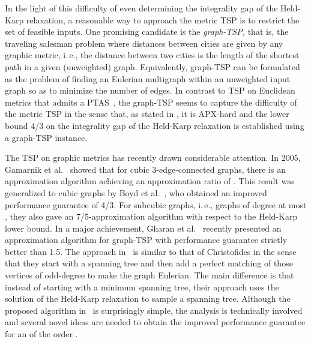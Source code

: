 \documentclass[letterpaper,11pt]{article}
\newcommand{\TSP}{graph-TSP\xspace}
\begin{document}
    In the light of this difficulty of even determining the integrality gap of
    the Held-Karp relaxation, a reasonable way to approach the metric TSP
    is to restrict the set of feasible inputs. One promising candidate is
    the \emph{\TSP,} that is, the traveling salesman problem where
    distances between cities are given by any graphic metric, i.\,e., the
    distance between two cities is the length of the shortest path in a
    given (unweighted) graph. Equivalently, \TSP can be formulated as the
    problem of finding an Eulerian multigraph within an unweighted input
    graph so as to minimize the number of edges. In contrast to TSP on
    Euclidean metrics that admits a PTAS~\cite{Arora98,Mitch99}, the \TSP
    seems to capture the difficulty of the metric TSP in the sense that,
    as stated in \cite{GKP95}, it is APX-hard and the lower bound 4/3 on
    the integrality gap of the Held-Karp relaxation is established using a
    \TSP instance.

    The TSP on graphic metrics has recently drawn considerable attention.
    In 2005, Gamarnik et al.~\cite{GLS05} showed that for cubic
    3-edge-connected graphs, there is an approximation algorithm achieving
    an approximation ratio of . This result was generalized to
    cubic graphs by Boyd et al.~\cite{BSSS11}, who obtained an improved
    performance guarantee of 4/3.  For subcubic graphs, i.\,e., graphs of
    degree at most , they also gave an 7/5-approximation algorithm with
    respect to the Held-Karp lower bound.  In a major achievement, Gharan
    et al.~\cite{GSS11} recently presented an approximation algorithm for
    \TSP with performance guarantee strictly better than 1.5. The approach
    in~\cite{GSS11} is similar to that of Christofides in the sense that
    they start with a spanning tree and then add a perfect matching of
    those vertices of odd-degree to make the graph Eulerian. The main
    difference is that instead of starting with a minimum spanning tree,
    their approach uses the solution of the Held-Karp relaxation to sample
    a spanning tree. Although the proposed algorithm in~\cite{GSS11} is
    surprisingly simple, the analysis is technically involved and several novel
    ideas are needed to obtain the improved performance guarantee
     for an  of the order .
\end{document}
